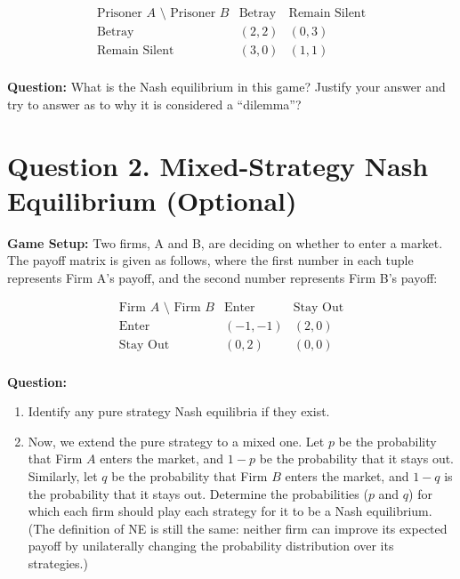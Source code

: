 \documentclass[12pt]{article}
\begin{document}
\[
\begin{array}{c|c|c}
\text{Prisoner $A$ \textbackslash\ Prisoner $B$} & \text{Betray} & \text{Remain Silent} \\
\hline
\text{Betray} & (2, 2) & (0, 3) \\
\text{Remain Silent} & (3, 0) & (1, 1) \\
\end{array}
\]

\textbf{Question:}
What is the Nash equilibrium in this game? Justify your answer and try to answer as to why it is considered a ``dilemma''?

\begin{solution}

\end{solution}

\section*{Question 2. Mixed-Strategy Nash Equilibrium (Optional)}
\textbf{Game Setup:}
Two firms, A and B, are deciding on whether to enter a market. The payoff matrix is given as follows, where the first number in each tuple represents Firm A's payoff, and the second number represents Firm B's payoff:

\[
\begin{array}{c|c|c}
\text{Firm $A$ \textbackslash\ Firm $B$} & \text{Enter} & \text{Stay Out} \\
\hline
\text{Enter} & (-1, -1) & (2, 0) \\
\text{Stay Out} & (0, 2) & (0, 0) \\
\end{array}
\]

\textbf{Question:}
\begin{enumerate}
    \item Identify any pure strategy Nash equilibria if they exist.
\item Now, we extend the pure strategy to a mixed one. Let 
$p$ be the probability that Firm $A$ enters the market, and 
$1-p$ be the probability that it stays out. Similarly, let 
$q$ be the probability that Firm $B$ enters the market, and 
$1-q$ is the probability that it stays out. Determine the probabilities ($p$ and $q$) for which each firm should play each strategy for it to be a Nash equilibrium. (The definition of NE is still the same: neither firm can improve its expected payoff by unilaterally changing the probability distribution over its strategies.)
\end{enumerate}
\end{document}
